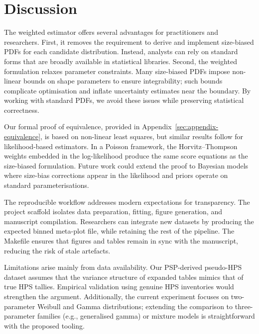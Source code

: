 \section{Discussion}

The weighted estimator offers several advantages for practitioners and
researchers. First, it removes the requirement to derive and implement
size-biased PDFs for each candidate distribution. Instead, analysts can rely on
standard forms that are broadly available in statistical libraries. Second, the
weighted formulation relaxes parameter constraints. Many size-biased PDFs
impose non-linear bounds on shape parameters to ensure integrability; such
bounds complicate optimisation and inflate uncertainty estimates near the
boundary. By working with standard PDFs, we avoid these issues while preserving
statistical correctness.

Our formal proof of equivalence, provided in Appendix~\ref{sec:appendix-equivalence},
is based on non-linear least squares, but similar results follow for
likelihood-based estimators. In a Poisson framework, the Horvitz--Thompson
weights embedded in the log-likelihood produce the same score equations as the
size-biased formulation. Future work could extend the proof to Bayesian models
where size-bias corrections appear in the likelihood and priors operate on
standard parameterisations.

The reproducible workflow addresses modern expectations for transparency. The
project scaffold isolates data preparation, fitting, figure generation, and
manuscript compilation. Researchers can integrate new datasets by producing the
expected binned meta-plot file, while retaining the rest of the pipeline. The
Makefile ensures that figures and tables remain in sync with the manuscript,
reducing the risk of stale artefacts.

Limitations arise mainly from data availability. Our PSP-derived pseudo-HPS
dataset assumes that the variance structure of expanded tables mimics that of
true HPS tallies. Empirical validation using genuine HPS inventories would
strengthen the argument. Additionally, the current experiment focuses on
two-parameter Weibull and Gamma distributions; extending the comparison to
three-parameter families (e.g., generalised gamma) or mixture models is
straightforward with the proposed tooling.
